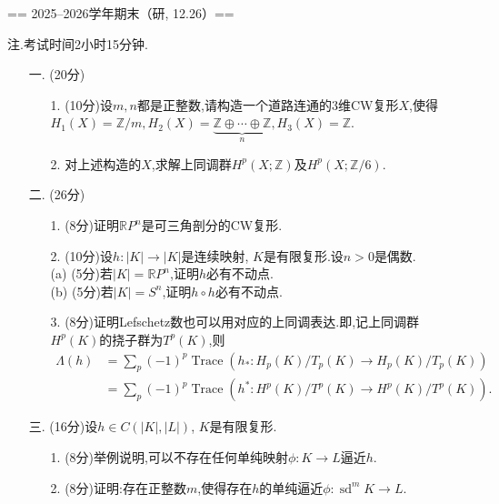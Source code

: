 
== 2025--2026学年期末（研, 12.26）==

注.考试时间2小时15分钟.

\begin{enumerate}
    \item[一.] (20分)
    \begin{itemize}
        \item[1.] (10分)设$m,n$都是正整数,请构造一个道路连通的3维CW复形$X$,使得
        $H_1(X)=\mathbb{Z}/m,H_2(X)=\underbrace{\mathbb{Z}\oplus\cdots\oplus\mathbb{Z}}_{n},H_3(X)=\mathbb{Z}$.
        \item[2.] 对上述构造的$X$,求解上同调群$H^p(X;\mathbb{Z})$及$H^p(X;\mathbb{Z}/6)$.
    \end{itemize}
    \item[二.] (26分)
    \begin{itemize}
        \item[1.] (8分)证明$\mathbb{R} P^n$是可三角剖分的CW复形.
        \item[2.] (10分)设$h:|K|\to|K|$是连续映射, $K$是有限复形.设$n>0$是偶数.\\
        (a) (5分)若$|K|=\mathbb{R} P^n$,证明$h$必有不动点.\\
        (b) (5分)若$|K|=S^n$,证明$h\circ h$必有不动点.
        \item[3.] (8分)证明Lefschetz数也可以用对应的上同调表达.即,记上同调群$H^p(K)$的挠子群为$T^p(K)$,则\[\begin{aligned}
        \Lambda(h)&=\sum_p(-1)^p\operatorname{Trace}(h_*:H_p(K)/T_p(K)\to H_p(K)/T_p(K))\\
        &=\sum_p(-1)^p\operatorname{Trace}(h^*:H^p(K)/T^p(K)\to H^p(K)/T^p(K)).
        \end{aligned}\]
    \end{itemize}
    \item[三.] (16分)设$h\in C(|K|,|L|)$, $K$是有限复形.
    \begin{itemize}
        \item[1.] (8分)举例说明,可以不存在任何单纯映射$\phi:K\to L$逼近$h$.
        \item[2.] (8分)证明:存在正整数$m$,使得存在$h$的单纯逼近$\phi:\operatorname{sd}^mK\to L$.

\end{itemize}
\end{enumerate}
